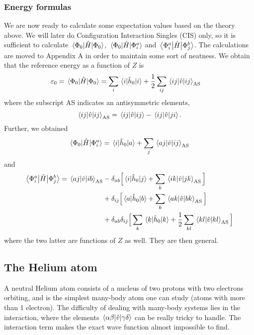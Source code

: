 \subsubsection{Energy formulas}
We are now ready to calculate some expectation values based on the theory above. We will later do Configuration Interaction Singles (CIS) only, so it is sufficient to calculate $\mel{\Phi_0}{\hat{H}}{\Phi_0}$, $\mel{\Phi_0}{\hat{H}}{\Phi_i^a}$ and $\mel{\Phi_i^a}{\hat{H}}{\Phi_j^b}$. The calculations are moved to Appendix A in order to maintain some sort of neatness. We obtain that the reference energy as a function
of $Z$ is
\begin{align}
	\varepsilon_0=\mel{\Phi_0}{\hat{H}}{\Phi_0}&=\sum_i\mel{i}{\hat{h}_0}{i}+\frac{1}{2}\sum_{ij}\mel{ij}{\hat{v}}{ij}_{\text{AS}}\label{eq:c_H_c}
\end{align}
where the subscript AS indicates an antisymmetric elements,
\begin{equation}
\mel{ij}{\hat{v}}{ij}_{\text{AS}}=\mel{ij}{\hat{v}}{ij}-\mel{ij}{\hat{v}}{ji}.
\end{equation}
Further, we obtained
\begin{equation}
\mel{\Phi_0}{\hat{H}}{\Phi_i^a}=\mel{i}{\hat{h}_0}{a}+\sum_j\mel{aj}{\hat{v}}{ij}_{\text{AS}}
\label{eq:c_H_ia}
\end{equation}
and
\begin{align}
	\mel{\Phi_i^a}{\hat{H}}{\Phi_j^b}=\mel{aj}{\hat{v}}{ib}_{\text{AS}}&-\delta_{ab}\Big[\mel{i}{\hat{h}_0}{j}+\sum_k\mel{ik}{\hat{v}}{jk}_{\text{AS}}\Big]\notag\\
	&+\delta_{ij}\Big[\mel{a}{\hat{h}_0}{b}+\sum_k\mel{ak}{\hat{v}}{bk}_{\text{AS}}\Big]\\
	&+\delta_{ab}\delta_{ij}\Big[\sum_k\mel{k}{\hat{h}_0}{k}+\frac{1}{2}\sum_{kl}\mel{kl}{\hat{v}}{kl}_{\text{AS}}\Big]\notag
	\label{eq:ia_H_jb}
\end{align}
where the two latter are functions of $Z$ as well. They are then general.

\subsection{The Helium atom}
A neutral Helium atom consists of a nucleus of two protons with two electrons orbiting, and is the simplest many-body atom one can study (atoms with more than 1 electron). The difficulty of dealing with many-body systems lies in the interaction, where the elements $\mel{\alpha\beta}{\hat{v}}{\gamma\delta}$ can be really tricky to handle. The interaction term makes the exact wave function almost impossible to find.


